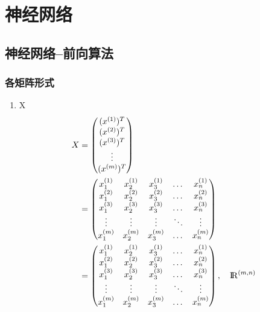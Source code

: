 \section{神经网络}
\subsection{神经网络--前向算法}

\subsubsection{各矩阵形式}
\begin{enumerate}
\item X
\begin{equation} \begin{aligned}
	X & = \left(\begin{matrix}
			(x^{(1)})^T \\ (x^{(2)})^T \\ (x^{(3)})^T \\ \vdots \\ (x^{(m)})^T \\
		\end{matrix}\right) \\
	& = \left( \begin{matrix}
			x_1^{(1)} & x_2^{(1)} & x_3^{(1)} & \dots & x_n^{(1)} \\
			x_1^{(2)} & x_2^{(2)} & x_3^{(2)} & \dots & x_n^{(2)} \\
			x_1^{(3)} & x_2^{(3)} & x_3^{(3)} & \dots & x_n^{(3)} \\
			\vdots    & \vdots    & \vdots    & \ddots & \vdots   \\
			x_1^{(m)} & x_2^{(m)} & x_3^{(m)} & \dots & x_n^{(m)} \\
			\end{matrix}\right) \\
	& = \left(\begin{matrix}
			x_1^{(1)} & x_2^{(1)} & x_3^{(1)} & \dots & x_n^{(1)} \\
			x_1^{(2)} & x_2^{(2)} & x_3^{(2)} & \dots & x_n^{(2)} \\
			x_1^{(3)} & x_2^{(3)} & x_3^{(3)} & \dots & x_n^{(3)} \\
			\vdots    & \vdots    & \vdots    & \ddots & \vdots   \\
			x_1^{(m)} & x_2^{(m)} & x_3^{(m)} & \dots & x_n^{(m)} \\
		\end{matrix}\right), \quad {\rm I\!R}^{(m,n)}
\end{aligned} \end{equation}


\end{enumerate}
